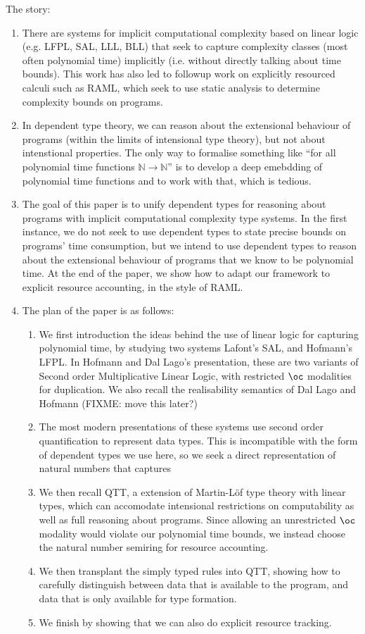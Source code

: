 \documentclass[acmsmall,review]{acmart}
\begin{document}
The story:
\begin{enumerate}
\item There are systems for implicit computational complexity based on
  linear logic (e.g. LFPL, SAL, LLL, BLL) that seek to capture
  complexity classes (most often polynomial time) implicitly
  (i.e. without directly talking about time bounds). This work has
  also led to followup work on explicitly resourced calculi such as
  RAML, which seek to use static analysis to determine complexity
  bounds on programs.
\item In dependent type theory, we can reason about the extensional
  behaviour of programs (within the limits of intensional type
  theory), but not about intenstional properties. The only way to
  formalise something like ``for all polynomial time functions
  $\mathbb{N} \to \mathbb{N}$'' is to develop a deep emebdding of
  polynomial time functions and to work with that, which is tedious.
\item The goal of this paper is to unify dependent types for reasoning
  about programs with implicit computational complexity type
  systems. In the first instance, we do not seek to use dependent
  types to state precise bounds on programs' time consumption, but we
  intend to use dependent types to reason about the extensional
  behaviour of programs that we know to be polynomial time. At the end
  of the paper, we show how to adapt our framework to explicit
  resource accounting, in the style of RAML.
\item The plan of the paper is as follows:
  \begin{enumerate}
  \item We first introduction the ideas behind the use of linear logic
    for capturing polynomial time, by studying two systems Lafont's
    SAL, and Hofmann's LFPL. In Hofmann and Dal Lago's presentation,
    these are two variants of Second order Multiplicative Linear
    Logic, with restricted $\oc$ modalities for duplication. We also
    recall the realisability semantics of Dal Lago and Hofmann (FIXME:
    move this later?)
  \item The most modern presentations of these systems use second
    order quantification to represent data types. This is incompatible
    with the form of dependent types we use here, so we seek a direct
    representation of natural numbers that captures
  \item We then recall QTT, a extension of Martin-Löf type theory with
    linear types, which can accomodate intensional restrictions on
    computability as well as full reasoning about programs. Since
    allowing an unrestricted $\oc$ modality would violate our
    polynomial time bounds, we instead choose the natural number
    semiring for resource accounting.
  \item We then transplant the simply typed rules into QTT, showing
    how to carefully distinguish between data that is available to the
    program, and data that is only available for type formation.
  \item We finish by showing that we can also do explicit resource
    tracking.
  \end{enumerate}
\end{enumerate}
\end{document}
